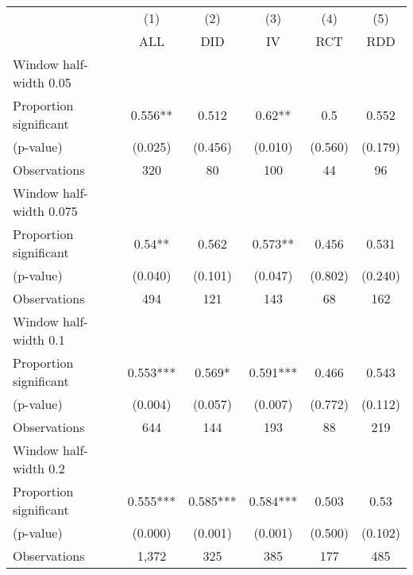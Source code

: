 
\def\sym#1{\ifmmode^{#1}\else\(^{#1}\)\fi}
\begin{tabular}{l*{5}{c}}
\hline\hline
& \multicolumn{1}{c}{(1)} &  \multicolumn{1}{c}{(2)} &  \multicolumn{1}{c}{(3)} &  \multicolumn{1}{c}{(4)} &  \multicolumn{1}{c}{(5)}\\
& \multicolumn{1}{c}{ALL} &  \multicolumn{1}{c}{DID} &  \multicolumn{1}{c}{IV} &  \multicolumn{1}{c}{RCT} &  \multicolumn{1}{c}{RDD}\\

\hline
\hline
Window half-width 0.05\\

Proportion significant& 0.556** &  0.512 &  0.62** &  0.5 &  0.552\\

(p-value) & (0.025) &  (0.456) &  (0.010) &  (0.560) &  (0.179)\\

Observations& 320 &  80 &  100 &  44 &  96\\

\hline
Window half-width 0.075\\

Proportion significant& 0.54** &  0.562 &  0.573** &  0.456 &  0.531\\

(p-value) & (0.040) &  (0.101) &  (0.047) &  (0.802) &  (0.240)\\

Observations& 494 &  121 &  143 &  68 &  162\\

\hline
Window half-width 0.1\\

Proportion significant& 0.553*** &  0.569* &  0.591*** &  0.466 &  0.543\\

(p-value) & (0.004) &  (0.057) &  (0.007) &  (0.772) &  (0.112)\\

Observations& 644 &  144 &  193 &  88 &  219\\

\hline
Window half-width 0.2\\

Proportion significant& 0.555*** &  0.585*** &  0.584*** &  0.503 &  0.53\\

(p-value) & (0.000) &  (0.001) &  (0.001) &  (0.500) &  (0.102)\\

Observations& 1,372 &  325 &  385 &  177 &  485\\


\end{tabular}
